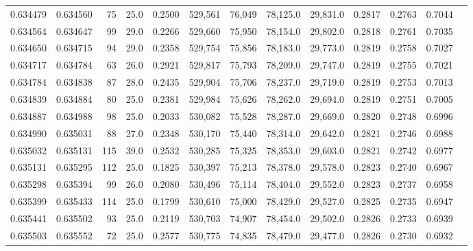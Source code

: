 \begin{tabular}{rrrrrrrrrrrrr}
0.634479 & 0.634560 &    75 & 25.0 &                                     0.2500 & 529,561 &  76,049 &  78,125.0 &  29,831.0 & 0.2817 & 0.2763 & 0.7044 \\
0.634564 & 0.634647 &    99 & 29.0 &                                     0.2266 & 529,660 &  75,950 &  78,154.0 &  29,802.0 & 0.2818 & 0.2761 & 0.7035 \\
0.634650 & 0.634715 &    94 & 29.0 &                                     0.2358 & 529,754 &  75,856 &  78,183.0 &  29,773.0 & 0.2819 & 0.2758 & 0.7027 \\
0.634717 & 0.634784 &    63 & 26.0 &                                     0.2921 & 529,817 &  75,793 &  78,209.0 &  29,747.0 & 0.2819 & 0.2755 & 0.7021 \\
0.634784 & 0.634838 &    87 & 28.0 &                                     0.2435 & 529,904 &  75,706 &  78,237.0 &  29,719.0 & 0.2819 & 0.2753 & 0.7013 \\
0.634839 & 0.634884 &    80 & 25.0 &                                     0.2381 & 529,984 &  75,626 &  78,262.0 &  29,694.0 & 0.2819 & 0.2751 & 0.7005 \\
0.634887 & 0.634988 &    98 & 25.0 &                                     0.2033 & 530,082 &  75,528 &  78,287.0 &  29,669.0 & 0.2820 & 0.2748 & 0.6996 \\
0.634990 & 0.635031 &    88 & 27.0 &                                     0.2348 & 530,170 &  75,440 &  78,314.0 &  29,642.0 & 0.2821 & 0.2746 & 0.6988 \\
0.635032 & 0.635131 &   115 & 39.0 &                                     0.2532 & 530,285 &  75,325 &  78,353.0 &  29,603.0 & 0.2821 & 0.2742 & 0.6977 \\
0.635131 & 0.635295 &   112 & 25.0 &                                     0.1825 & 530,397 &  75,213 &  78,378.0 &  29,578.0 & 0.2823 & 0.2740 & 0.6967 \\
0.635298 & 0.635394 &    99 & 26.0 &                                     0.2080 & 530,496 &  75,114 &  78,404.0 &  29,552.0 & 0.2823 & 0.2737 & 0.6958 \\
0.635399 & 0.635433 &   114 & 25.0 &                                     0.1799 & 530,610 &  75,000 &  78,429.0 &  29,527.0 & 0.2825 & 0.2735 & 0.6947 \\
0.635441 & 0.635502 &    93 & 25.0 &                                     0.2119 & 530,703 &  74,907 &  78,454.0 &  29,502.0 & 0.2826 & 0.2733 & 0.6939 \\
0.635503 & 0.635552 &    72 & 25.0 &                                     0.2577 & 530,775 &  74,835 &  78,479.0 &  29,477.0 & 0.2826 & 0.2730 & 0.6932 \\

\end{tabular}
